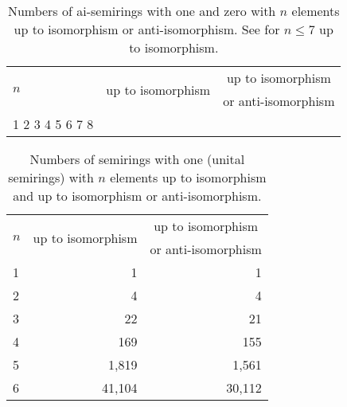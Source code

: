 \documentclass{article}
\theoremstyle{definition}
\theoremstyle{plain}
\begin{document}
\begin{table}[ht]
  \centering
  \begin{tabular}{l|r|r}
    \multirow{2}{*}{$n$} & \multicolumn{1}{|c|}{\multirow{2}{*}{up to
    isomorphism}} & \multicolumn{1}{c}{up to isomorphism} \\
    & & \multicolumn{1}{l}{or anti-isomorphism}\\
    \midrule
    1
    2
    3
    4
    5
    6
    7
    8
  \end{tabular}
  \caption{Numbers of ai-semirings with one and zero with $n$
    elements up
    to isomorphism or anti-isomorphism. See \cite{MSAiSemiringsWithOneAndZero} for \(n\leq7\) up to isomorphism.}
  \label{tab:ai-semirings-with-one-and-zero}
\end{table}

\begin{table}[h]
  \centering
  \begin{tabular}{l|r|r}
    \multirow{2}{*}{$n$} & \multicolumn{1}{|c|}{\multirow{2}{*}{up to
    isomorphism}} & \multicolumn{1}{c}{up to isomorphism} \\
    & & \multicolumn{1}{l}{or anti-isomorphism}\\
    \midrule
    1 & 1         & 1      \\
    2 & 4         & 4      \\
    3 & 22        & 21     \\
    4 & 169       & 155    \\
    5 & 1,819     & 1,561  \\
    6 & 41,104    & 30,112 \\
  \end{tabular}
  \caption{Numbers of semirings with one (unital semirings) with $n$
  elements up to isomorphism and up to isomorphism or anti-isomorphism.}
  \label{tab:unital-semirings}
\end{table}

\printbibliography
\end{document}

